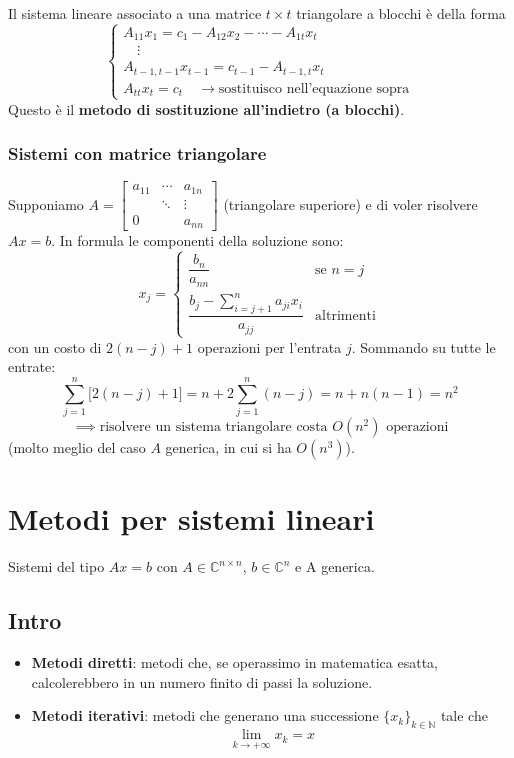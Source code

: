 \documentclass[12pt,a4paper,]{report}
\begin{document}
Il sistema lineare associato a una matrice $t\times t$ triangolare a blocchi è della forma
\[
\begin{cases}
A_{11}x_1 = c_1 - A_{12}x_2 - \cdots - A_{1t}x_t \\
\quad\vdots \\
A_{t-1,t-1}x_{t-1} = c_{t-1} - A_{t-1,t}x_t \\
A_{tt}x_t = c_t \quad\to \text{sostituisco nell'equazione sopra}
\end{cases}
\]
Questo è il \textbf{metodo di sostituzione all'indietro (a blocchi)}.

\subsection{Sistemi con matrice triangolare}
Supponiamo $A = \begin{bmatrix} a_{11} & \cdots & a_{1n} \\ & \ddots & \vdots \\ 0 & & a_{nn}\end{bmatrix}$ (triangolare superiore) e di voler risolvere $Ax=b$.
\noindent
In formula le componenti della soluzione sono:
\[
x_j =
\begin{cases}
\dfrac{b_n}{a_{nn}} & \text{se } n=j \\[10pt]
\dfrac{\displaystyle b_j - \sum_{i=j+1}^{n}a_{ji}x_i}{a_{jj}} & \text{altrimenti}
\end{cases}
\]
con un costo di $2(n-j)+1$ operazioni per l'entrata $j$. Sommando su tutte le entrate:
\[
\sum_{j=1}^{n}\big[2(n-j)+1\big] = n + 2\sum_{j=1}^{n}(n-j) = n+n(n-1) = n^2
\]
\[
\implies \text{risolvere un sistema triangolare costa } O(n^2) \text{ operazioni}
\]
(molto meglio del caso $A$ generica, in cui si ha $O(n^3)$).


\chapter{Metodi per sistemi lineari}

Sistemi del tipo $Ax=b$ con $A\in \mathbb{C}^{n\times n}$, $b\in \mathbb{C}^n$ e A generica.

\section{Intro}
\begin{itemize}
    \item \textbf{Metodi diretti}: metodi che, se operassimo in matematica esatta, calcolerebbero in un numero finito di passi la soluzione.
    \item \textbf{Metodi iterativi}: metodi che generano una successione $\{x_k\}_{k\in\mathbb{N}}$ tale che \[\lim_{k\to +\infty} x_k = x\]
\end{itemize}
\end{document}
